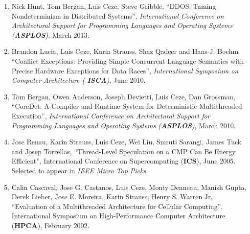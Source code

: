\nextthing
{}
\noindent\begin{enumerate}


\item Nick Hunt, Tom Bergan, Luis Ceze, Steve Gribble, ``DDOS: Taming Nondeterminism in Distributed Systems'', {\em International Conference on
    Architectural Support for Programming Languages and Operating
    Systems ({\bf ASPLOS})}, March 2013.


\item Brandon Lucia, Luis Ceze, Karin Strauss, Shaz Qadeer and
  Hans-J. Boehm ``Conflict Exceptions: Providing Simple Concurrent
  Language Semantics with Precise Hardware Exceptions for Data
  Races'', {\em International Symposium on Computer Architecture ({\bf
      ISCA})}, June 2010.

\item Tom Bergan, Owen Anderson, Joseph Devietti, Luis Ceze, Dan
  Grossman, ``CoreDet: A Compiler and Runtime System for Deterministic
  Multithreaded Execution'', {\em International Conference on
    Architectural Support for Programming Languages and Operating
    Systems ({\bf ASPLOS})}, March 2010.


\item Jose Renau, Karin Strauss, Luis Ceze, Wei Liu, Smruti Sarangi, James Tuck and Josep Torrellas, ``Thread-Level Speculation on a CMP Can Be Energy Efficient'', International Conference on Supercomputing (\textbf{ICS}), June 2005.       Selected to appear
    in {\em IEEE Micro Top Picks.}

\item Calin Cascaval, Jose G. Castanos, Luis Ceze, Monty Denneau, Manish Gupta, Derek Lieber, Jose E. Moreira, Karin Strauss, Henry S. Warren Jr,
``Evaluation of a Multithreaded Architecture for Cellular Computing'',
International Symposium on High-Performance Computer Architecture (\textbf{HPCA}), February 2002.

\end{enumerate}


